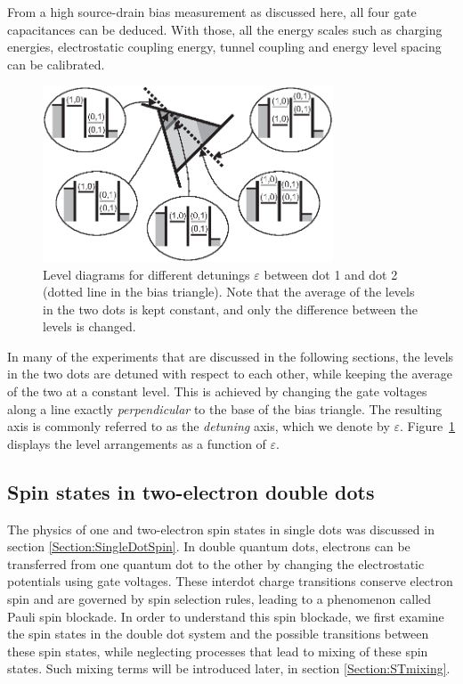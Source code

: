 \documentclass[rmp,twocolumn,aps]{revtex4}
\begin{document}
From a high source-drain bias measurement as discussed here, all four gate
capacitances can be deduced. With those, all the energy scales
such as charging energies, electrostatic coupling energy, tunnel
coupling and energy level spacing can be calibrated.

\begin{figure}[htb]
\includegraphics[width=3.4in, clip=true]{hanson_fig31.eps}
\caption{Level diagrams for different detunings $\varepsilon$ between dot 1 and
dot 2 (dotted line in the bias triangle). Note that the average of
the levels in the two dots is kept constant, and only the
difference between the levels is changed.} \label{Fig:DDdetuning}
\end{figure}

In many of the experiments that are discussed in the following
sections, the levels in the two dots are detuned with respect to
each other, while keeping the average of the two at a constant
level. This is achieved by changing the gate voltages along a line
exactly \textit{perpendicular} to the base of the bias triangle.
The resulting axis is commonly referred to as the
\textit{detuning} axis, which we denote by $\varepsilon$. Figure~\ref{Fig:DDdetuning} displays the
level arrangements as a function of $\varepsilon$.

\subsection{Spin states in two-electron double dots}
\label{Sec:DDspinstates}
The physics of one and two-electron spin states in single dots was discussed in section
\ref{Section:SingleDotSpin}. In double quantum dots, electrons can
be transferred from one quantum dot to the other by changing the
electrostatic potentials using gate voltages. These interdot
charge transitions conserve electron spin and are governed by spin
selection rules, leading to a phenomenon called Pauli spin
blockade. In order to understand this spin blockade, we first
examine the spin states in the double dot system and the possible
transitions between these spin states, while neglecting processes
that lead to mixing of these spin states. Such mixing terms will
be introduced later, in section \ref{Section:STmixing}.
\end{document}
